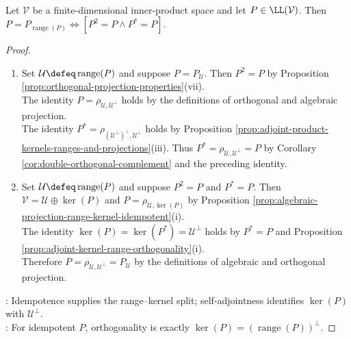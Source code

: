 \begin{theorem} \label{thm:orthogonal-projection-self-adjoint-idempotent} \\
Let $\mathcal{V}$ be a finite-dimensional inner-product space and let $P\in\LL(\mathcal{V})$. Then $P=P_{\operatorname{range}(P)}\Longleftrightarrow[P^2=P\land P^*=P]$.
\begin{proof}
\begin{enumerate}[label=\roman*.]
\setlength{\itemsep}{0pt}
\item[$(\Rightarrow)$] Set $\mathcal{U}\defeq\operatorname{range}(P)$ and suppose $P=P_{\mathcal{U}}$. Then $P^2=P$ by Proposition \ref{prop:orthogonal-projection-properties}(vii).\\
The identity $P=\rho_{\mathcal{U},\mathcal{U}^{\perp}}$ holds by the definitions of orthogonal and algebraic projection.\\
The identity $P^*=\rho_{(\mathcal{U}^{\perp})^{\perp},\mathcal{U}^{\perp}}$ holds by Proposition \ref{prop:adjoint-product-kernels-ranges-and-projections}(iii). Thus $P^*=\rho_{\mathcal{U},\mathcal{U}^{\perp}}=P$ by Corollary \ref{cor:double-orthogonal-complement} and the preceding identity.
\item[$(\Leftarrow)$] Set $\mathcal{U}\defeq\operatorname{range}(P)$ and suppose $P^2=P$ and $P^*=P$. Then $\mathcal{V}=\mathcal{U}\oplus\ker(P)$ and $P=\rho_{\mathcal{U},\ker(P)}$ by Proposition \ref{prop:algebraic-projection-range-kernel-idempotent}(i).\\
The identity $\ker(P)=\ker(P^*)=\mathcal{U}^{\perp}$ holds by $P^*=P$ and Proposition \ref{prop:adjoint-kernel-range-orthogonality}(i).\\
Therefore $P=\rho_{\mathcal{U},\mathcal{U}^{\perp}}=P_{\mathcal{U}}$ by the definitions of algebraic and orthogonal projection.
\end{enumerate}
: Idempotence supplies the range--kernel split; self-adjointness identifies $\ker(P)$ with $\mathcal{U}^{\perp}$.\\
: For idempotent $P$, orthogonality is exactly $\ker(P)=(\operatorname{range}(P))^{\perp}$.
\end{proof}
\end{theorem}
